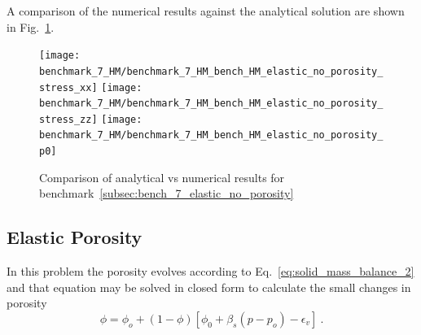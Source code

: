 \documentclass[]{scrreprt}
\begin{document}
A comparison of the numerical results against the analytical solution are shown in Fig.~\ref{fig:benchmark7_no_porosity}.
\begin{figure}
  \centering
  \texttt{[image: benchmark\_7\_HM/benchmark\_7\_HM\_bench\_HM\_elastic\_no\_porosity\_stress\_xx]}
  \texttt{[image: benchmark\_7\_HM/benchmark\_7\_HM\_bench\_HM\_elastic\_no\_porosity\_stress\_zz]}
  \texttt{[image: benchmark\_7\_HM/benchmark\_7\_HM\_bench\_HM\_elastic\_no\_porosity\_p0]}
  \caption{Comparison of analytical vs numerical results for benchmark~\ref{subsec:bench_7_elastic_no_porosity}}
  \label{fig:benchmark7_no_porosity}
 \end{figure}
 
\subsection{Elastic Porosity}
\label{subsec:bench_7_elastic_with_porosity}
In this problem the porosity evolves according to Eq.~\ref{eq:solid_mass_balance_2} and that  equation may be solved in closed form   to calculate the small changes in porosity \begin{equation}
\label{eq:Evolution_of_Porosity}
\phi = \phi_o+(1-\phi) \left[ \phi_0+\beta_s (p-p_o) - \epsilon_v \right] \ .
\end{equation}
 
\end{document}
